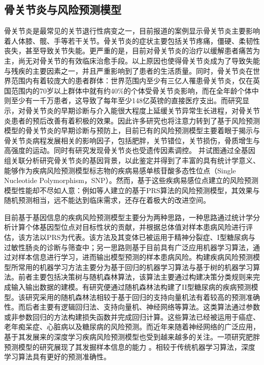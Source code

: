 \subsection{骨关节炎与风险预测模型}
骨关节炎是最常见的关节退行性病变之一，目前报道的案例显示骨关节炎主要影响着人体膝、髋、手等若干关节。骨关节炎的症状主要包括关节疼痛，僵硬、柔韧性丧失，甚至导致关节失能。更严重的是，目前对骨关节炎的治疗以缓解患者痛苦为主，尚无对骨关节的有效临床治愈手段。以上原因也使得骨关节炎成为了导致失能与残疾的主要因素之一，并且严重影响到了患者的生活质量。\cite{martel-pelletier_osteoarthritis_2016}同时，骨关节炎在世界范围内有着较庞大的患者群体：世界范围内至少有三亿人罹患骨关节炎\cite{james_global_2018}，仅在英国范围内的70岁以上群体中就有约40\%的个体受骨关节炎影响\cite{vos_years_2012}，而在全年龄个体中则至少有一千万患者，这导致了每年至少148亿英镑的直接医疗支出。\cite{hiligsmann_health_2013}而研究显示，对骨关节炎的早期诊断与介入能很大程度上延缓关节异常生长进程，对骨关节炎患者的预后改善有着积极的效果\cite{martel-pelletier_osteoarthritis_2016}。因此许多研究也将注意力转到了基于风险预测模型的骨关节炎的早期诊断与预防上，目前已有的风险预测模型主要着眼于揭示与骨关节炎病程发展相关的影响因子，包括肥胖，关节错位，关节损伤，骨质增生与高强度的运动\cite{cooper_risk_2000,zhang_methodologic_2010,veronese_osteoarthritis_2016}。同时有研究发现骨关节炎也受遗传因素调控。\cite{styrkarsdottir_meta-analysis_2018} 并试图通过全基因组关联分析研究骨关节炎的基因背景，以此鉴定并得到了丰富的具有统计学意义、能够作为疾病风险预测模型标志物的疾病易感单核苷酸多态性位点（Single Nucleotide Polymorphism，SNP）\cite{arcogen_consortium_identification_2019,zengini_genome-wide_2018}。然而，基于这些疾病易感位点建立的风险预测模型性能却不尽如人意：例如\cite{arcogen_consortium_identification_2019}等人建立的基于PRS算法的风险预测模型，其效果与随机预测相当，远不能达到临床需求，还存在着极大的改进空间。

目前基于基因信息的疾病风险预测模型主要分为两种思路，一种思路通过统计学分析计算个体基因型位点对目标性状的贡献，并根据总体值对样本患病风险进行评估，该方法以PRS为代表\cite{choi_tutorial:_2020}。该方法及其变体已被运用于精神分裂症、I型糖尿病与过敏性肠炎的诊断与筛查中\cite{jostins_genetic_2011,wray_research_2014,so_exploring_2017}；另一思路则基于目前具有广泛应用机器学习算法，通过对样本信息进行学习，进而输出模型预测的样本患病风险。构建疾病风险预测模型所常用的机器学习方法主要分为基于回归的机器学习算法与基于树的机器学习算法。前者主要包括决策树与随机森林算法，该算法主要通过构建决策分类规则来完成输入输出数据的建模。有研究便通过随机森林法构建了II型糖尿病的疾病预测模型。\cite{lopez_single_2018}该研究采用的随机森林法相较于基于回归的支持向量机法有着较高的预测准确性。而后者主要有逻辑回归法、支持向量机、神经网络等算法。这类算法通过参数或非参数回归的方法构建损失函数并完成回归计算。这些算法已经被运用于癌症、老年痴呆症、心脏病以及糖尿病的风险预测\cite{capriotti_predicting_2006,cruz_applications_2006,palaniappan_intelligent_2008,yu_application_2010,zhang_multi-modal_2012}。而近年来随着神经网络的广泛应用，基于其发展来的深度学习疾病风险预测模型也受到越来越多的关注。一项研究肥胖预测模型的研究展现了其发掘样本信息的能力 \cite{montanez_deep_2018}。相较于传统机器学习算法，深度学习算法具有更好的预测准确性。

